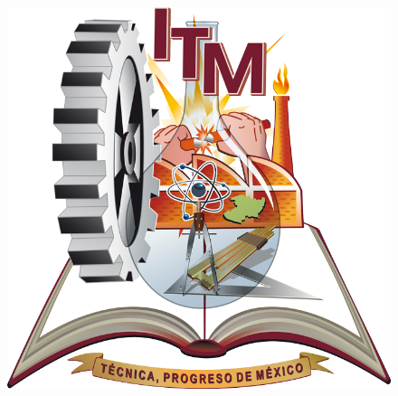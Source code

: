 \documentclass[12pt]{report}
\begin{document}
\tableofcontents
\begin{titlepage}
		\begin{center}
			\vspace*{-1in}
			\begin{figure}[htb]
			\centering
					\includegraphics[scale=0.2]{logo_original}
			\end{figure}
			

\end{center}
\end{titlepage}
\end{document}
